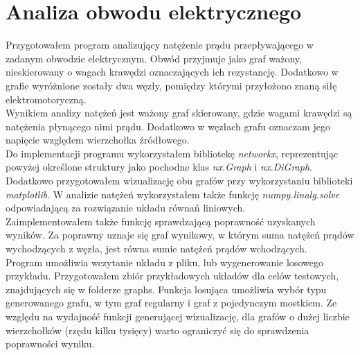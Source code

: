 \documentclass{article}
\begin{document}
    \section{Analiza obwodu elektrycznego}
        Przygotowałem program analizujący natężenie prądu przepływającego w zadanym obwodzie elektrycznym. Obwód przyjmuje jako graf ważony, nieskierowany o wagach krawędzi oznaczających ich rezystancję. Dodatkowo w grafie wyróżnione zostały dwa węzły, pomiędzy którymi przyłożono znaną siłę elektromotoryczną. \\
        Wynikiem analizy natężeń jest ważony graf skierowany, gdzie wagami krawędzi są natężenia płynącego nimi prądu. Dodatkowo w węzłach grafu oznaczam jego napięcie względem wierzchołka źródłowego.\\
        Do implementacji programu wykorzystałem bibliotekę \textit{networkx}, reprezentując powyżej określone struktury jako pochodne klas \textit{nx.Graph} i \textit{nx.DiGraph}. Dodatkowo przygotowałem wizualizację obu grafów przy wykorzystaniu biblioteki \textit{matplotlib}. W analizie natężeń wykorzystałem także funkcję \textit{numpy.linalg.solve} odpowiadającą za rozwiązanie układu równań liniowych.\\
        Zaimplementowałem także funkcję sprawdzającą poprawność uzyskanych wyników. Za poprawny uznaje się graf wynikowy, w którym suma natężeń prądów wychodzących z węzła, jest równa sumie natężeń prądów wchodzących. \\
        Program umożliwia wczytanie układu z pliku, lub wygenerowanie losowego przykładu. Przygotowałem zbiór przykładowych układów dla celów testowych, znajdujących się w folderze graphs. Funkcja losująca umożliwia wybór typu generowanego grafu, w tym graf regularny i graf z pojedynczym mostkiem. Ze względu na wydajność funkcji generującej wizualizację, dla grafów o dużej liczbie wierzchołków (rzędu kilku tysięcy) warto ograniczyć się do sprawdzenia poprawności wyniku. \\
        
        
        
        
        


    
\end{document}
